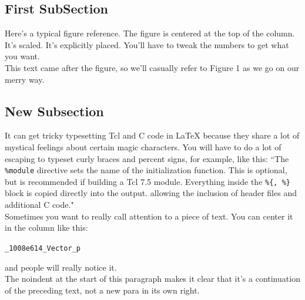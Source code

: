 \documentclass[letterpaper,twocolumn,10pt]{article}
\begin{document}
\subsection{First SubSection}

Here's a typical figure reference.  The figure is centered at the
top of the column.  It's scaled.  It's explicitly placed.  You'll
have to tweak the numbers to get what you want.\\



This text came after the figure, so we'll casually refer to Figure 1
as we go on our merry way.

\subsection{New Subsection}

It can get tricky typesetting Tcl and C code in LaTeX because they share
a lot of mystical feelings about certain magic characters.  You
will have to do a lot of escaping to typeset curly braces and percent
signs, for example, like this:
``The {\tt \%module} directive
sets the name of the initialization function.  This is optional, but is
recommended if building a Tcl 7.5 module.
Everything inside the {\tt \%\{, \%\}}
block is copied directly into the output. allowing the inclusion of
header files and additional C code." \\

Sometimes you want to really call attention to a piece of text.  You
can center it in the column like this:
\begin{center}
{\tt \_1008e614\_Vector\_p}
\end{center}
and people will really notice it.\\

\noindent
The noindent at the start of this paragraph makes it clear that it's
a continuation of the preceding text, not a new para in its own right.
\end{document}

